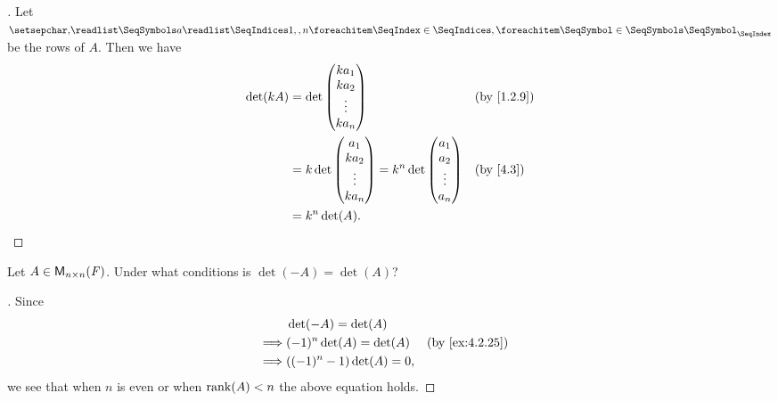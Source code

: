 \begin{proof}[]
	Let \(\seq{a}{1,,n}\) be the rows of \(A\).
	Then we have
	\begin{align*}
		\det(kA) & = \det\begin{pmatrix}
			                 k a_1  \\
			                 k a_2  \\
			                 \vdots \\
			                 k a_n
		                 \end{pmatrix}                   &  & \by{1.2.9}       \\
		         & = k \det\begin{pmatrix}
			                   a_1    \\
			                   k a_2  \\
			                   \vdots \\
			                   k a_n
		                   \end{pmatrix} = k^n \det\begin{pmatrix}
			                                           a_1    \\
			                                           a_2    \\
			                                           \vdots \\
			                                           a_n
		                                           \end{pmatrix} &  & \by{4.3} \\
		         & = k^n \det(A).
	\end{align*}
\end{proof}

\begin{ex}\label{ex:4.2.26}
	Let \(A \in \ms[n][n][\F]\).
	Under what conditions is \(\det(-A) = \det(A)\)?
\end{ex}

\begin{proof}[]
	Since
	\begin{align*}
		         & \det(-A) = \det(A)                            \\
		\implies & (-1)^n \det(A) = \det(A)  &  & \by{ex:4.2.25} \\
		\implies & ((-1)^n - 1) \det(A) = 0,
	\end{align*}
	we see that when \(n\) is even or when \(\rk{A} < n\) the above equation holds.
\end{proof}

